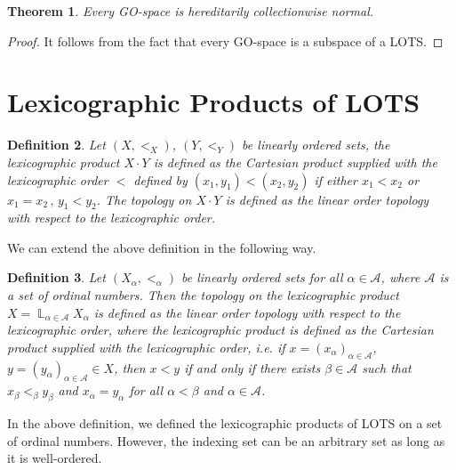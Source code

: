 \documentclass[12pt,oneside,english]{amsbook}
\numberwithin{equation}{section} %
\numberwithin{figure}{section} %
\theoremstyle{plain}
\numberwithin{section}{chapter}
\newtheorem{thm}{Theorem}[section]
\theoremstyle{plain}
\newtheorem{defn}[thm]{Definition}
\DeclareMathOperator{\LP}{\mathbb{L}}
\begin{document}
\begin{thm}
  Every GO-space is hereditarily collectionwise normal.
\end{thm}
\begin{proof}
  It follows from the fact that every GO-space is a subspace of a LOTS.
\end{proof}

\section{Lexicographic Products of LOTS}
 
\begin{defn}\label{def:lexicographic_product}
  Let $(X,<_{X})$, $(Y,<_{Y})$ be linearly ordered sets, the lexicographic product $X \cdot Y$ is defined as the Cartesian product supplied with the lexicographic order $<$ defined by $(x_{1},y_{1}) < (x_{2}, y_{2})$ if either $x_{1} < x_{2}$ or $x_{1} = x_{2}\, , \, y_{1} < y_{2}$. The topology on $X \cdot Y$ is defined as the linear order topology with respect to the lexicographic order.
\end{defn}
We can extend the above definition in the following way.

\begin{defn}
Let $(X_{\alpha}, <_{\alpha})$ be linearly ordered sets for all $\alpha \in \mathcal{A}$, where $\mathcal{A}$ is a set of ordinal numbers. Then the topology on the lexicographic product $X = \LP_{\alpha \in \mathcal{A}}X_{\alpha}$ is defined as the linear order topology with respect to the lexicographic order, where the lexicographic product is defined as the Cartesian product supplied with the lexicographic order, i.e. if $x = (x_{\alpha})_{\alpha \in \mathcal{A}}$, $y = (y_{\alpha})_{\alpha \in \mathcal{A}} \in X$, then $x < y$ if and only if there exists $\beta \in \mathcal{A}$ such that $x_{\beta} <_{\beta} y_{\beta}$ and $x_{\alpha} = y_{\alpha}$ for all $\alpha < \beta$ and $\alpha \in \mathcal{A}$.
\end{defn}

In the above definition, we defined the lexicographic products of LOTS on a set of ordinal numbers. However, the indexing set can be an arbitrary set as long as it is well-ordered.  
\end{document}
